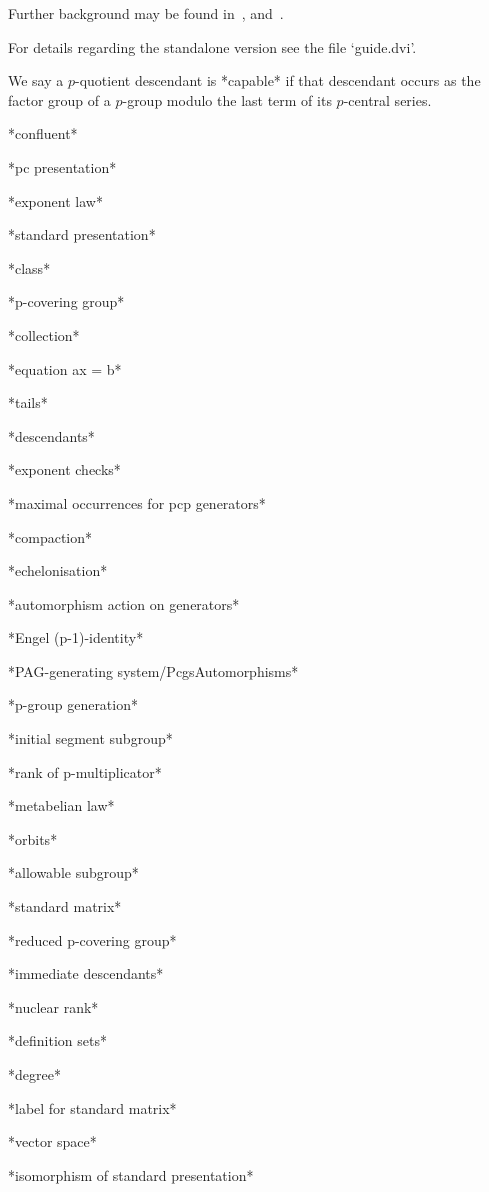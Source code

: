 \endlist

Further   background   may   be   found   in~\cite{OBr95},   \cite{Vau84}
and~\cite{NNN98}.

For details regarding the standalone version see the file `guide.dvi'.

We say a $p$-quotient descendant is *capable* if that  descendant  occurs
as the  factor  group  of  a  $p$-group  modulo  the  last  term  of  its
$p$-central series.

*confluent*

*pc presentation*

*exponent law*

*standard presentation*

*class*

*p-covering group*

*collection*

*equation ax = b*

*tails*

*descendants*

*exponent checks*

*maximal occurrences for pcp generators*

*compaction*

*echelonisation*

*automorphism action on generators*

*Engel (p-1)-identity*

*PAG-generating system/PcgsAutomorphisms*

*p-group generation*

*initial segment subgroup*

*rank of p-multiplicator*

*metabelian law*

*orbits*

*allowable subgroup*

*standard matrix*

*reduced p-covering group*

*immediate descendants*

*nuclear rank*

*definition sets*

*degree*

*label for standard matrix*

*vector space*

*isomorphism of standard presentation*

